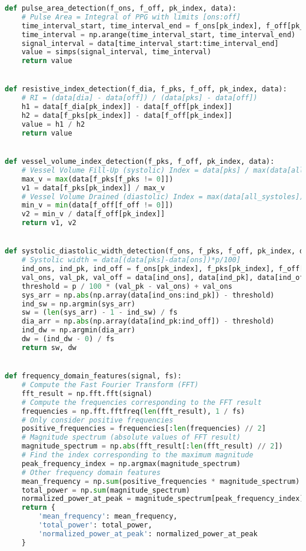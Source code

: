 \begin{lstlisting}[language=Python,label={lst:fe.py}, basicstyle=\scriptsize]
def pulse_area_detection(f_ons, f_off, pk_index, data):
    # Pulse Area = Integral of PPG with limits [ons:off]
    time_interval_start, time_interval_end = f_ons[pk_index], f_off[pk_index]
    time_interval = np.arange(time_interval_start, time_interval_end)
    signal_interval = data[time_interval_start:time_interval_end]
    value = simps(signal_interval, time_interval)
    return value


def resistive_index_detection(f_dia, f_pks, f_off, pk_index, data):
    # RI = (data[dia] - data[off]) / (data[pks] - data[off])
    h1 = data[f_dia[pk_index]] - data[f_off[pk_index]]
    h2 = data[f_pks[pk_index]] - data[f_off[pk_index]]
    value = h1 / h2
    return value


def vessel_volume_index_detection(f_pks, f_off, pk_index, data):
    # Vessel Volume Fill-Up (systolic) Index = data[pks] / max(data[all_systoles])
    max_v = max(data[f_pks[f_pks != 0]])
    v1 = data[f_pks[pk_index]] / max_v
    # Vessel Volume Drained (diastolic) Index = max(data[all_systoles]) / data[off]
    min_v = min(data[f_off[f_off != 0]])
    v2 = min_v / data[f_off[pk_index]]
    return v1, v2


def systolic_diastolic_width_detection(f_ons, f_pks, f_off, pk_index, data, fs, p):
    # Systolic width = data[(data[pks]-data[ons])*p/100]
    ind_ons, ind_pk, ind_off = f_ons[pk_index], f_pks[pk_index], f_off[pk_index]
    val_ons, val_pk, val_off = data[ind_ons], data[ind_pk], data[ind_off]
    threshold = p / 100 * (val_pk - val_ons) + val_ons
    sys_arr = np.abs(np.array(data[ind_ons:ind_pk]) - threshold)
    ind_sw = np.argmin(sys_arr)
    sw = (len(sys_arr) - 1 - ind_sw) / fs
    dia_arr = np.abs(np.array(data[ind_pk:ind_off]) - threshold)
    ind_dw = np.argmin(dia_arr)
    dw = (ind_dw - 0) / fs
    return sw, dw


def frequency_domain_features(signal, fs):
    # Compute the Fast Fourier Transform (FFT)
    fft_result = np.fft.fft(signal)
    # Compute the frequencies corresponding to the FFT result
    frequencies = np.fft.fftfreq(len(fft_result), 1 / fs)
    # Only consider positive frequencies
    positive_frequencies = frequencies[:len(frequencies) // 2]
    # Magnitude spectrum (absolute values of FFT result)
    magnitude_spectrum = np.abs(fft_result[:len(fft_result) // 2])
    # Find the index corresponding to the maximum magnitude
    peak_frequency_index = np.argmax(magnitude_spectrum)
    # Other frequency domain features
    mean_frequency = np.sum(positive_frequencies * magnitude_spectrum) / np.sum(magnitude_spectrum)
    total_power = np.sum(magnitude_spectrum)
    normalized_power_at_peak = magnitude_spectrum[peak_frequency_index] / total_power
    return {
        'mean_frequency': mean_frequency,
        'total_power': total_power,
        'normalized_power_at_peak': normalized_power_at_peak
    }
\end{lstlisting}